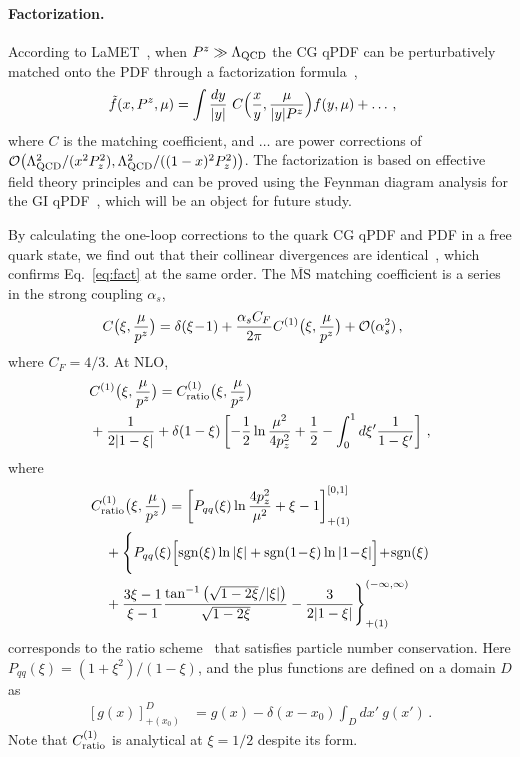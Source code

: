 \documentclass[prd,twocolumn,preprintnumbers,showpacs,nofootinbib,superscriptaddress,notitlepage,floatfix]{revtex4-1}
\DeclareRobustCommand{\eq}[1]{Eq.~\eqref{eq:#1}}
\DeclareRobustCommand{\eq}[1]{Eq.~(\ref{eq:#1})}
\newcommand{\MS}{{\overline{\mathrm{MS}}}}
\newcommand{\nn}{\nonumber}
\begin{document}
\paragraph*{Factorization.} According to LaMET~\cite{Ji:2020ect}, when $P^z\gg \Lambda_{\rm QCD}$ the CG qPDF can be perturbatively matched onto the PDF through a factorization formula~\cite{Izubuchi:2018srq},
\begin{align}\label{eq:fact}
	\tilde f(x,P^z,\mu) &= \int {dy\over |y|}\ C\Big({x\over y}, {\mu\over |y|P^z}\Big) f(y,\mu) + \ldots\,,
\end{align}
where $C$ is the matching coefficient, and $\ldots$ are power corrections of ${\cal O}\big({\Lambda_{\rm QCD}^2/ (x^2P_z^2)},{\Lambda_{\rm QCD}^2/ ((1-x)^2P_z^2})\big)$. The factorization is based on effective field theory principles and can be proved using the Feynman diagram analysis for the GI qPDF~\cite{Ma:2014jla,Ji:2020ect}, which will be an object for future study.

By calculating the one-loop corrections to the quark CG qPDF and PDF in a free quark state, we find out that their collinear divergences are identical~\cite{Xiong:2013bka}, which confirms \eq{fact} at the same order. The $\MS$ matching coefficient is a series in the strong coupling $\alpha_s$,
\begin{align}\label{eq:qpdf_match}
	C\big(\xi, {\mu\over p^z}\big) &= \delta(\xi\!-\!1) + {\alpha_sC_F\over 2\pi}C^{(1)}\big(\xi,{\mu\over p^z}\big) + {\cal O}(\alpha_s^2)\,,
\end{align}
where $C_F=4/3$.
At NLO,
\begin{align}
	&C^{(1)}\big(\xi,{\mu\over p^z}\big) = C^{(1)}_{\rm ratio}\big(\xi,{\mu\over p^z}\big)\\
	& + {1\over 2|1-\xi|} +\delta(1-\xi) \left[-{1\over 2}\ln {\mu^2\over 4p_z^2} +{1\over2} - \int_0^1 d\xi' {1\over 1-\xi'}\right]\,,\nn
\end{align}
where
\begin{align}
    &C^{(1)}_{\rm ratio}\big(\xi,{\mu\over p^z}\big) = \left[P_{qq}(\xi)\ln{4p_z^2\over\mu^2} + \xi - 1\right]_{+(1)}^{[0,1]} \\
    & \quad + \Bigg\{P_{qq}(\xi) \Big[\text{sgn}(\xi)\ln|\xi| + \text{sgn}(1\!-\!\xi)\ln|1\!-\!\xi|\Big] \!+\! \text{sgn}(\xi)\nn\\
    &\quad + {3 \xi-1\over \xi-1} \frac{\tan^{-1}\left(\sqrt{1-2 \xi}/|\xi|\right)}{\sqrt{1-2 \xi}} - {3\over 2|1-\xi|} \Bigg\}_{+(1)}^{(-\infty, \infty)}\nn
\end{align}
corresponds to the ratio scheme~\cite{Orginos:2017kos} that satisfies particle number conservation. Here $P_{qq}(\xi)=(1+\xi^2)/(1-\xi)$, and the plus functions are defined on a domain $D$ as
\begin{align}
	\left[g(x)\right]^D_{+(x_0)} &= g(x) - \delta(x-x_0)\int_D dx'\ g(x')\,.
\end{align}
Note that $C^{(1)}_{\rm ratio}$ is analytical at $\xi=1/2$ despite its form.
\end{document}
